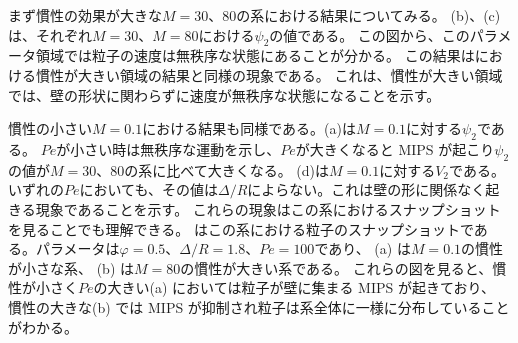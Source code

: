 \documentclass[/Users/ikedahajime/GitHub/reserch/master_report/thesis]{subfiles}
\begin{document}
まず慣性の効果が大きな$M=30、80$の系における結果についてみる。
(b)、(c)は、それぞれ$M=30、M=80$における$\psi_2$の値である。
この図から、このパラメータ領域では粒子の速度は無秩序な状態にあることが分かる。
この結果はにおける慣性が大きい領域の結果と同様の現象である。
これは、慣性が大きい領域では、壁の形状に関わらずに速度が無秩序な状態になることを示す。

慣性の小さい$M=0.1$における結果も同様である。(a)は$M=0.1$に対する$\psi_2$である。
$Pe$が小さい時は無秩序な運動を示し、$Pe$が大きくなると MIPS が起こり$\psi_2$の値が$M=30、80$の系に比べて大きくなる。
(d)は$M=0.1$に対する$V_2$である。
いずれの$Pe$においても、その値は$\Delta/R$によらない。これは壁の形に関係なく起きる現象であることを示す。
これらの現象はこの系におけるスナップショットを見ることでも理解できる。
はこの系における粒子のスナップショットである。パラメータは$\varphi=0.5、\Delta/R=1.8、Pe=100$であり、
(a) は$M=0.1$の慣性が小さな系、 (b) は$M=80$の慣性が大きい系である。
これらの図を見ると、慣性が小さく$Pe$の大きい(a) においては粒子が壁に集まる MIPS が起きており、
慣性の大きな(b) では MIPS が抑制され粒子は系全体に一様に分布していることがわかる。
\end{document}
